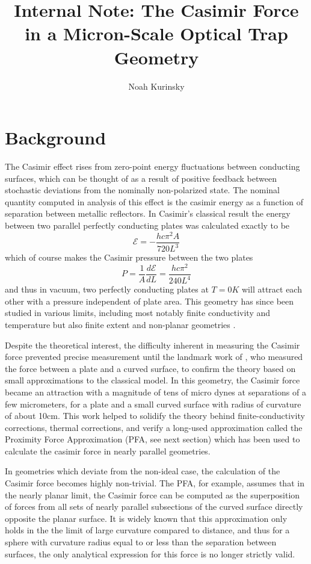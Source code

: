 \documentclass[11pt]{article}
\title{\vspace{-0.5in}Internal Note: The Casimir Force in a Micron-Scale Optical Trap Geometry}
\author{Noah Kurinsky}
\newcommand{\E}{\mathcal{E}}
\begin{document}
\maketitle

\section{Background}

The Casimir effect rises from zero-point energy fluctuations between conducting surfaces, which can be thought of as a result of positive feedback between stochastic deviations from the nominally non-polarized state. The nominal quantity computed in analysis of this effect is the casimir energy as a function of separation between metallic reflectors. In Casimir's classical result \citep{Casimir} the energy between two parallel perfectly conducting plates was calculated exactly to be \citep{ScatteringTheory}
$$
\E=-\frac{hc\pi^2A}{720L^3}
$$
which of course makes the Casimir pressure between the two plates
$$
P=\frac{1}{A}\frac{d\E}{dL}=\frac{hc\pi^2}{240L^4}
$$
and thus in vacuum, two perfectly conducting plates at $T=0K$ will attract each other with a pressure independent of plate area. This geometry has since been studied in various limits, including most notably finite conductivity and temperature \citep[][ and references therein]{ScatteringTheory} but also finite extent and non-planar geometries \citep[][ and references therein]{Rahi}.

Despite the theoretical interest, the difficulty inherent in measuring the Casimir force prevented precise measurement until the landmark work of \citet{Lamoreaux}, who measured the force between a plate and a curved surface, to confirm the theory based on small approximations to the classical model. In this geometry, the Casimir force became an attraction with a magnitude of tens of micro dynes at separations of a few micrometers, for a plate and a small curved surface with radius of curvature of about 10cm. This work helped to solidify the theory behind finite-conductivity corrections, thermal corrections, and verify a long-used approximation called the Proximity Force Approximation (PFA, see next section) which has been used to calculate the casimir force in nearly parallel geometries.

In geometries which deviate from the non-ideal case, the calculation of the Casimir force becomes highly non-trivial. The PFA, for example, assumes that in the nearly planar limit, the Casimir force can be computed as the superposition of forces from all sets of nearly parallel subsections of the curved surface directly opposite the planar surface. It is widely known that this approximation only holds in the the limit of large curvature compared to distance, and thus for a sphere with curvature radius equal to or less than the separation between surfaces, the only analytical expression for this force is no longer strictly valid.
\end{document}
